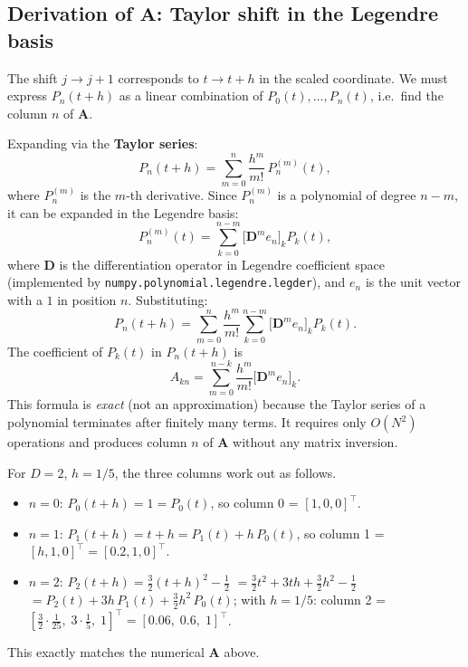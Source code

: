 \documentclass[11pt, a4paper]{article}
\theoremstyle{definition}
\newcommand{\mA}{\bm{A}}
\begin{document}
\subsection{Derivation of \texorpdfstring{$\mA$}{A}: Taylor shift in the Legendre basis}

The shift $j \to j+1$ corresponds to $t \to t + h$ in the scaled
coordinate.  We must express $P_n(t+h)$ as a linear combination of
$P_0(t), \ldots, P_n(t)$, i.e.\ find the column $n$ of $\mA$.

Expanding via the \textbf{Taylor series}:
\begin{equation}
  P_n(t+h) = \sum_{m=0}^{n} \frac{h^m}{m!}\, P_n^{(m)}(t),
  \label{eq:taylor}
\end{equation}
where $P_n^{(m)}$ is the $m$-th derivative.  Since $P_n^{(m)}$ is a
polynomial of degree $n-m$, it can be expanded in the Legendre basis:
\[
  P_n^{(m)}(t) = \sum_{k=0}^{n-m} \bigl[\mathbf{D}^m e_n\bigr]_k P_k(t),
\]
where $\mathbf{D}$ is the differentiation operator in Legendre coefficient
space (implemented by \texttt{numpy.polynomial.legendre.legder}), and
$e_n$ is the unit vector with a $1$ in position $n$.  Substituting:
\begin{equation}
  P_n(t+h) = \sum_{m=0}^{n} \frac{h^m}{m!}
             \sum_{k=0}^{n-m} \bigl[\mathbf{D}^m e_n\bigr]_k P_k(t).
\end{equation}
The coefficient of $P_k(t)$ in $P_n(t+h)$ is
\[
  A_{kn} = \sum_{m=0}^{n-k} \frac{h^m}{m!} \bigl[\mathbf{D}^m e_n\bigr]_k.
\]
This formula is \emph{exact} (not an approximation) because the Taylor
series of a polynomial terminates after finitely many terms.  It
requires only $O(N^2)$ operations and produces column $n$ of $\mA$
without any matrix inversion.

For $D=2$, $h=1/5$, the three columns work out as follows.
\begin{itemize}
  \item $n=0$: $P_0(t+h) = 1 = P_0(t)$, so column 0 = $[1,0,0]^\top$.
  \item $n=1$: $P_1(t+h) = t+h = P_1(t) + h\,P_0(t)$, so column 1 = $[h,1,0]^\top = [0.2,1,0]^\top$.
  \item $n=2$: $P_2(t+h) = \tfrac{3}{2}(t+h)^2 - \tfrac{1}{2}$
    $= \tfrac{3}{2}t^2 + 3th + \tfrac{3}{2}h^2 - \tfrac{1}{2}$
    $= P_2(t) + 3h\,P_1(t) + \tfrac{3}{2}h^2\,P_0(t)$;
    with $h=1/5$: column 2 = $[\tfrac{3}{2}\cdot\tfrac{1}{25},\;3\cdot\tfrac{1}{5},\;1]^\top = [0.06,\;0.6,\;1]^\top$.
\end{itemize}
This exactly matches the numerical $\mA$ above.
\end{document}
